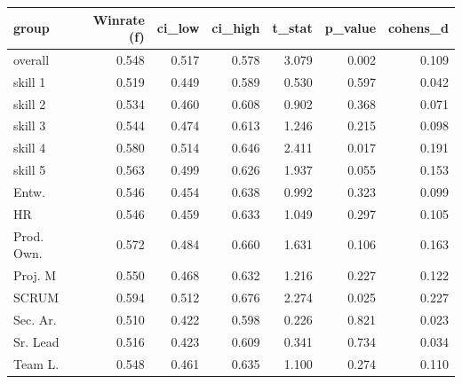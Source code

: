 \begin{tabular}{lrrrrrr}
\toprule
group & Winrate (f) & ci\_low & ci\_high & t\_stat & p\_value & cohens\_d \\
\midrule
overall & 0.548 & 0.517 & 0.578 & 3.079 & 0.002 & 0.109 \\
skill 1 & 0.519 & 0.449 & 0.589 & 0.530 & 0.597 & 0.042 \\
skill 2 & 0.534 & 0.460 & 0.608 & 0.902 & 0.368 & 0.071 \\
skill 3 & 0.544 & 0.474 & 0.613 & 1.246 & 0.215 & 0.098 \\
skill 4 & 0.580 & 0.514 & 0.646 & 2.411 & 0.017 & 0.191 \\
skill 5 & 0.563 & 0.499 & 0.626 & 1.937 & 0.055 & 0.153 \\
Entw. & 0.546 & 0.454 & 0.638 & 0.992 & 0.323 & 0.099 \\
HR & 0.546 & 0.459 & 0.633 & 1.049 & 0.297 & 0.105 \\
Prod. Own. & 0.572 & 0.484 & 0.660 & 1.631 & 0.106 & 0.163 \\
Proj. M & 0.550 & 0.468 & 0.632 & 1.216 & 0.227 & 0.122 \\
SCRUM & 0.594 & 0.512 & 0.676 & 2.274 & 0.025 & 0.227 \\
Sec. Ar. & 0.510 & 0.422 & 0.598 & 0.226 & 0.821 & 0.023 \\
Sr. Lead & 0.516 & 0.423 & 0.609 & 0.341 & 0.734 & 0.034 \\
Team L. & 0.548 & 0.461 & 0.635 & 1.100 & 0.274 & 0.110 \\
\bottomrule
\end{tabular}
